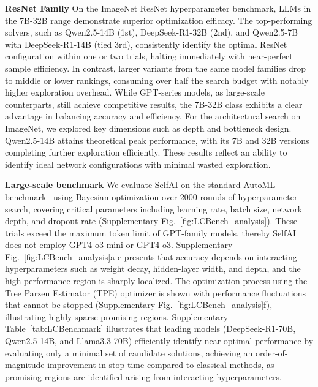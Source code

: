{\noindent\bf ResNet Family} On the ImageNet ResNet hyperparameter benchmark, LLMs in the 7B-32B range demonstrate superior optimization efficacy. The top-performing solvers, such as Qwen2.5-14B (1st), DeepSeek-R1-32B (2nd), and Qwen2.5-7B with DeepSeek-R1-14B (tied 3rd), consistently identify the optimal ResNet configuration within one or two trials, halting immediately with near-perfect sample efficiency. In contrast, larger variants from the same model families drop to middle or lower rankings, consuming over half the search budget with notably higher exploration overhead. While GPT-series models, as large-scale counterparts, still achieve competitive results, the 7B-32B class exhibits a clear advantage in balancing accuracy and efficiency. For the architectural search on ImageNet, we explored key dimensions such as depth and bottleneck design. Qwen2.5-14B attains theoretical peak performance, with its 7B and 32B versions completing further exploration efficiently. These results reflect an ability to identify ideal network configurations with minimal wasted exploration.

{\noindent\bf Large-scale benchmark} We evaluate SelfAI on the standard AutoML benchmark~\cite{zimmer2021auto} using Bayesian optimization over 2000 rounds of hyperparameter search, covering critical parameters including learning rate, batch size, network depth, and dropout rate (Supplementary Fig.~\ref{fig:LCBench_analysis}). These trials exceed the maximum token limit of GPT-family models, thereby SelfAI does not employ GPT4-o3-mini or GPT4-o3. Supplementary Fig.~\ref{fig:LCBench_analysis}a-e presents that accuracy depends on interacting hyperparameters such as weight decay, hidden-layer width, and depth, and the high-performance region is sharply localized. The optimization process using the Tree Parzen Estimator (TPE) optimizer is shown with performance fluctuations that cannot be stopped (Supplementary Fig.~\ref{fig:LCBench_analysis}f), illustrating highly sparse promising regions. Supplementary Table~\ref{tab:LCBenchmark} illustrates that leading models (DeepSeek-R1-70B, Qwen2.5-14B, and Llama3.3-70B) efficiently identify near-optimal performance by evaluating only a minimal set of candidate solutions, achieving an order-of-magnitude improvement in stop-time compared to classical methods, as promising regions are identified arising from interacting hyperparameters.


